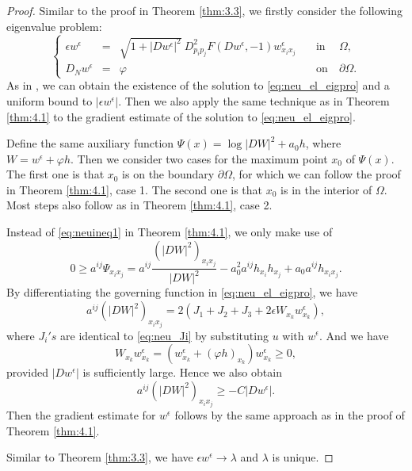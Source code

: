 \documentclass[12pt]{article}
\numberwithin{equation}{section}
\theoremstyle{plain}
\theoremstyle{definition}
\theoremstyle{remark}
\begin{document}
\begin{proof}
    Similar to the proof in Theorem \ref{thm:3.3}, we firstly consider the following eigenvalue problem: 
\begin{equation} \label{eq:neu_el_eigpro}
    \left\{ \begin{array}{cllcl}
           \epsilon w^{\epsilon}  & = & \sqrt{1+|Dw^{\epsilon}|^2} \  D^2_{p_i p_j} F (Dw^{\epsilon},-1) w^{\epsilon}_{x_i x_j}    \quad &  \text{in} &  \ \Omega , \\
            D_N w^{\epsilon} & = & \varphi  \quad  & \text{on}  & \ \partial \Omega .
    \end{array}  \right.
\end{equation}
As in \cite{MWW}, we can obtain the existence of the solution to \eqref{eq:neu_el_eigpro} and a uniform bound to $| \epsilon w^{\epsilon}|$. Then we also apply the same technique as in Theorem \ref{thm:4.1} to the gradient estimate of the solution to \eqref{eq:neu_el_eigpro}. 

Define the same auxiliary function $\Psi(x) = \log{|DW|^2} + a_0 h$, where
$W = w^{\epsilon} + \varphi h$. Then we consider two cases for the maximum point $x_0$ of $\Psi(x)$. The first one is that $x_0$ is on the boundary $\partial \Omega$, for which we can follow the proof in Theorem \ref{thm:4.1}, case 1. The second one is that $x_0$ is in the interior of $\Omega$. Most steps also follow as in Theorem \ref{thm:4.1}, case 2.

Instead of \eqref{eq:neuineq1} in Theorem \ref{thm:4.1}, we only make use of 
\begin{equation} \label{neu_el_max}
    0 \geq a^{ij} \Psi_{x_i x_j} = 
    a^{ij} \frac{\left(|DW|^2\right)_{x_i x_j}}{|DW|^2}  - a_0^2 a^{ij} h_{x_i} h_{x_j} + a_0 a^{ij} h_{x_i x_j} .
\end{equation}
By differentiating the governing function in \eqref{eq:neu_el_eigpro}, we have
\begin{equation}
    a^{ij} \left(|DW|^2 \right)_{x_i x_j} = 2 \left(J_1 + J_2 +J_3 + 2 \epsilon W_{x_k} w^{\epsilon}_{x_k} \right),
\end{equation}
where $J_i's$ are identical to \eqref{eq:neu_Ji} by substituting $u$ with $w^{\epsilon}$. And we have
\begin{equation*}
    W_{x_k} w^{\epsilon}_{x_k} = \left(w^{\epsilon}_{x_k} + (\varphi h)_{x_k} \right) w^{\epsilon}_{x_k} \geq 0,
\end{equation*}
provided $|Dw^{\epsilon}|$ is sufficiently large. Hence we also obtain
\begin{equation*}
    a^{ij} \left(|DW|^2 \right)_{x_i x_j} \geq -C |Dw^{\epsilon}|.
\end{equation*}
Then the gradient estimate for $w^{\epsilon}$ follows by the same approach as in the proof of Theorem \ref{thm:4.1}. 

Similar to Theorem \ref{thm:3.3}, we have $\epsilon w^{\epsilon} \rightarrow \lambda$ and $\lambda$ is unique.
\end{proof}
\end{document}
